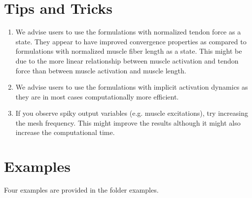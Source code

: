 \documentclass[a4paper,oneside,11pt]{article}
\begin{document}
\section{Tips and Tricks}

\begin{enumerate}
	\item We advise users to use the formulations with normalized tendon force as a state. They appear to have improved convergence properties as compared to formulations with normalized muscle fiber length as a state. This might be due to the more linear relationship between muscle activation and tendon force than between muscle activation and muscle length.
	\item We advise users to use the formulations with implicit activation dynamics as they are in most cases computationally more efficient.
	\item If you observe spiky output variables (e.g. muscle excitations), try increasing the mesh frequency. This might improve the results although it might also increase the computational time.
	
	\end{enumerate}	

\section{Examples}
\label{Examples}

Four examples are provided in the folder examples.
\end{document}
